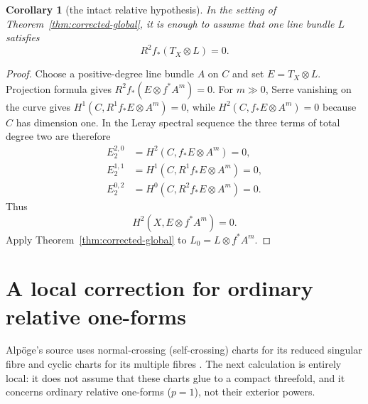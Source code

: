 \documentclass[11pt]{amsart}
\theoremstyle{plain}
\newtheorem{corollary}[theorem]{Corollary}
\theoremstyle{definition}
\theoremstyle{remark}
\begin{document}
\begin{corollary}[the intact relative hypothesis]
\label{cor:relative}
In the setting of Theorem~\ref{thm:corrected-global}, it is enough to assume
that one line bundle $L$ satisfies
\[
 R^2f_*(T_X\otimes L)=0.
 \tag{5.8}
\]
\end{corollary}

\begin{proof}
Choose a positive-degree line bundle $A$ on $C$ and set
$E=T_X\otimes L$.  Projection formula gives
\(R^2f_*(E\otimes f^*A^m)=0\).  For $m\gg0$, Serre vanishing on the curve
gives
\(H^1(C,R^1f_*E\otimes A^m)=0\), while
\(H^2(C,f_*E\otimes A^m)=0\) because $C$ has dimension one.  In the Leray
spectral sequence the three terms of total degree two are therefore
\[
\begin{aligned}
 E_2^{2,0}&=H^2(C,f_*E\otimes A^m)=0,\\
 E_2^{1,1}&=H^1(C,R^1f_*E\otimes A^m)=0,\\
 E_2^{0,2}&=H^0(C,R^2f_*E\otimes A^m)=0.
\end{aligned}
\]
Thus
\[
 H^2(X,E\otimes f^*A^m)=0.
\]
Apply Theorem~\ref{thm:corrected-global} to
$L_0=L\otimes f^*A^m$.
\end{proof}

\section{A local correction for ordinary relative one-forms}
\label{sec:relative-one-forms}

Alp{\"o}ge's source uses normal-crossing (self-crossing) charts for its reduced
singular fibre and cyclic charts for its multiple fibres
\cite[Sec.~10.2, source PDF pp.~87--88]{S6Source}.  The next
calculation is entirely local: it does not assume that these charts glue to a
compact threefold, and it concerns ordinary relative one-forms ($p=1$), not
their exterior powers.
\end{document}
